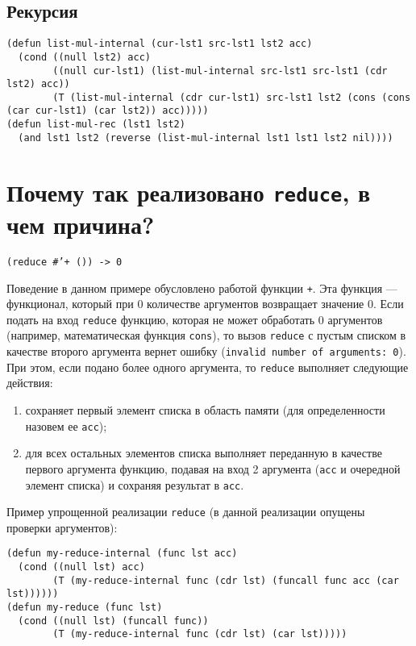 \subsection{Рекурсия}
\begin{lstlisting}
(defun list-mul-internal (cur-lst1 src-lst1 lst2 acc)
  (cond ((null lst2) acc)
        ((null cur-lst1) (list-mul-internal src-lst1 src-lst1 (cdr lst2) acc))
        (T (list-mul-internal (cdr cur-lst1) src-lst1 lst2 (cons (cons (car cur-lst1) (car lst2)) acc)))))
(defun list-mul-rec (lst1 lst2)
  (and lst1 lst2 (reverse (list-mul-internal lst1 lst1 lst2 nil))))
\end{lstlisting}


\section{Почему так реализовано \texttt{reduce}, в чем причина?}

\texttt{(reduce #'+ ()) -> 0}

Поведение в данном примере обусловлено работой функции \texttt{+}. Эта функция --- функционал, который при 0 количестве аргументов возвращает значение 0. Если подать на вход \texttt{reduce} функцию, которая не может обработать 0 аргументов (например, математическая функция \texttt{cons}), то вызов \texttt{reduce} с пустым списком в качестве второго аргумента вернет ошибку (\texttt{invalid number of arguments: 0}). При этом, если подано более одного аргумента, то \texttt{reduce} выполняет следующие действия:
\begin{enumerate}
    \item сохраняет первый элемент списка в область памяти (для определенности назовем ее \texttt{acc});
    \item для всех остальных элементов списка выполняет переданную в качестве первого аргумента функцию, подавая на вход 2 аргумента (\texttt{acc} и очередной элемент списка) и сохраняя результат в \texttt{acc}.
\end{enumerate}

Пример упрощенной реализации \texttt{reduce} (в данной реализации опущены проверки аргументов):

\begin{lstlisting}
(defun my-reduce-internal (func lst acc)
  (cond ((null lst) acc)
        (T (my-reduce-internal func (cdr lst) (funcall func acc (car lst))))))
(defun my-reduce (func lst)
  (cond ((null lst) (funcall func))
        (T (my-reduce-internal func (cdr lst) (car lst)))))
\end{lstlisting}

